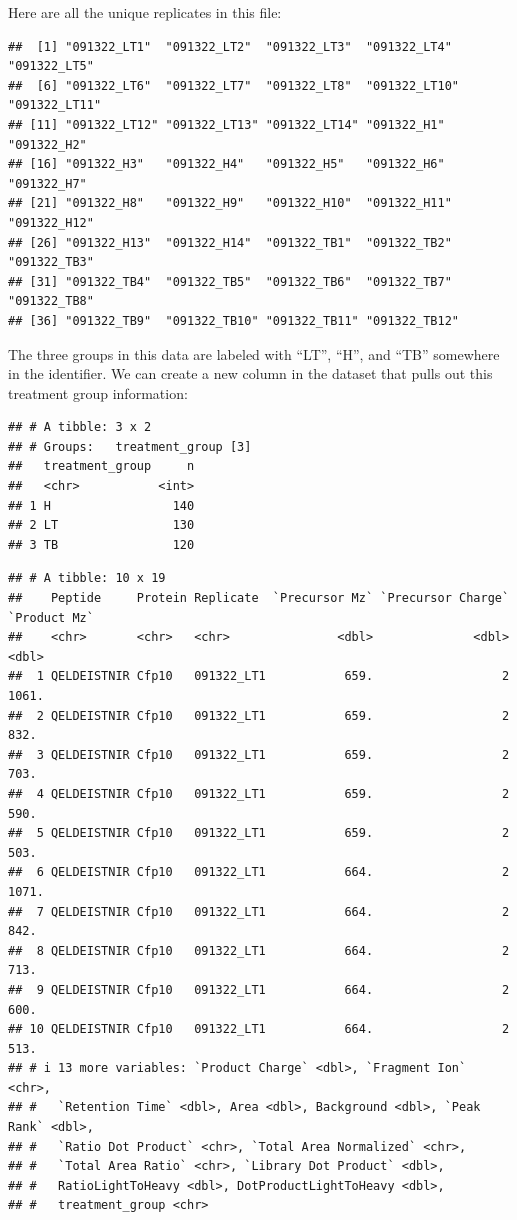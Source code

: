 \documentclass[
]{book}
\begin{document}
Here are all the unique replicates in this file:

\begin{verbatim}
##  [1] "091322_LT1"  "091322_LT2"  "091322_LT3"  "091322_LT4"  "091322_LT5" 
##  [6] "091322_LT6"  "091322_LT7"  "091322_LT8"  "091322_LT10" "091322_LT11"
## [11] "091322_LT12" "091322_LT13" "091322_LT14" "091322_H1"   "091322_H2"  
## [16] "091322_H3"   "091322_H4"   "091322_H5"   "091322_H6"   "091322_H7"  
## [21] "091322_H8"   "091322_H9"   "091322_H10"  "091322_H11"  "091322_H12" 
## [26] "091322_H13"  "091322_H14"  "091322_TB1"  "091322_TB2"  "091322_TB3" 
## [31] "091322_TB4"  "091322_TB5"  "091322_TB6"  "091322_TB7"  "091322_TB8" 
## [36] "091322_TB9"  "091322_TB10" "091322_TB11" "091322_TB12"
\end{verbatim}

The three groups in this data are labeled with ``LT'', ``H'', and ``TB'' somewhere in
the identifier. We can create a new column in the dataset that pulls out this
treatment group information:

\begin{verbatim}
## # A tibble: 3 x 2
## # Groups:   treatment_group [3]
##   treatment_group     n
##   <chr>           <int>
## 1 H                 140
## 2 LT                130
## 3 TB                120
\end{verbatim}

\begin{verbatim}
## # A tibble: 10 x 19
##    Peptide     Protein Replicate  `Precursor Mz` `Precursor Charge` `Product Mz`
##    <chr>       <chr>   <chr>               <dbl>              <dbl>        <dbl>
##  1 QELDEISTNIR Cfp10   091322_LT1           659.                  2        1061.
##  2 QELDEISTNIR Cfp10   091322_LT1           659.                  2         832.
##  3 QELDEISTNIR Cfp10   091322_LT1           659.                  2         703.
##  4 QELDEISTNIR Cfp10   091322_LT1           659.                  2         590.
##  5 QELDEISTNIR Cfp10   091322_LT1           659.                  2         503.
##  6 QELDEISTNIR Cfp10   091322_LT1           664.                  2        1071.
##  7 QELDEISTNIR Cfp10   091322_LT1           664.                  2         842.
##  8 QELDEISTNIR Cfp10   091322_LT1           664.                  2         713.
##  9 QELDEISTNIR Cfp10   091322_LT1           664.                  2         600.
## 10 QELDEISTNIR Cfp10   091322_LT1           664.                  2         513.
## # i 13 more variables: `Product Charge` <dbl>, `Fragment Ion` <chr>,
## #   `Retention Time` <dbl>, Area <dbl>, Background <dbl>, `Peak Rank` <dbl>,
## #   `Ratio Dot Product` <chr>, `Total Area Normalized` <chr>,
## #   `Total Area Ratio` <chr>, `Library Dot Product` <dbl>,
## #   RatioLightToHeavy <dbl>, DotProductLightToHeavy <dbl>,
## #   treatment_group <chr>
\end{verbatim}
\end{document}
